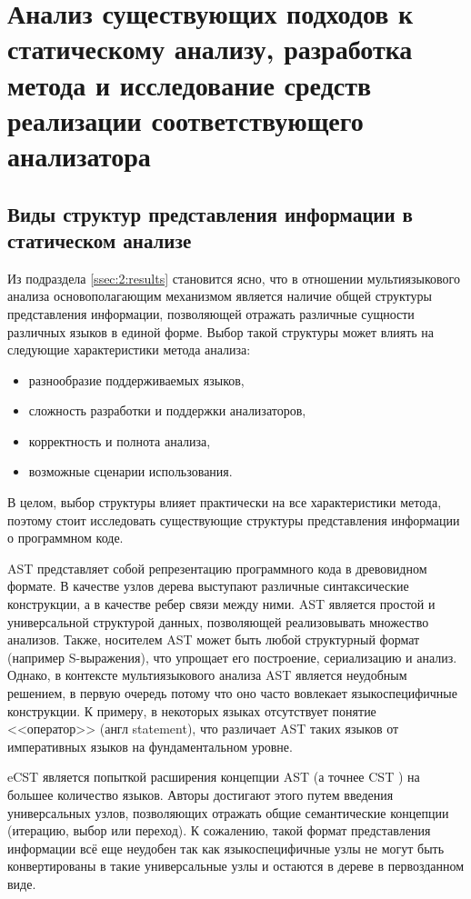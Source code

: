 \chapter{Анализ существующих подходов к статическому анализу, разработка метода и
исследование средств реализации соответствующего анализатора}

\section{Виды структур представления информации в статическом анализе}

Из подраздела \ref{ssec:2:results} становится ясно, что в отношении мультиязыкового анализа
основополагающим механизмом является наличие общей структуры представления информации, позволяющей отражать различные
сущности различных языков в единой форме. Выбор такой структуры может влиять на следующие
характеристики метода анализа:
\begin{itemize}
    \item разнообразие поддерживаемых языков,
    \item сложность разработки и поддержки анализаторов,
    \item корректность и полнота анализа,
    \item возможные сценарии использования.
\end{itemize}
В целом, выбор структуры влияет практически на все характеристики метода, поэтому стоит
исследовать существующие структуры представления информации о программном коде.

AST 
 представляет собой репрезентацию программного кода в древовидном формате. В качестве узлов дерева выступают различные синтаксические конструкции, а в качестве ребер связи между ними. AST является
простой и универсальной структурой данных, позволяющей реализовывать множество анализов. Также,
носителем AST может быть любой структурный формат (например S-выражения), что упрощает его
построение, сериализацию и анализ. Однако, в контексте мультиязыкового анализа AST является
неудобным решением, в первую очередь потому что оно часто вовлекает языкоспецифичные конструкции.
К примеру, в некоторых языках отсутствует понятие <<оператор>> (англ statement), что различает
AST таких языков от императивных языков на фундаментальном уровне.

eCST \cite{eCST} является попыткой расширения концепции AST (а точнее CST ) на большее
количество языков. Авторы достигают этого путем введения универсальных узлов, позволяющих
отражать общие семантические концепции (итерацию, выбор или переход). К сожалению, такой формат
представления информации всё еще неудобен так как языкоспецифичные узлы не могут быть конвертированы
в такие универсальные узлы и остаются в дереве в первозданном виде.

